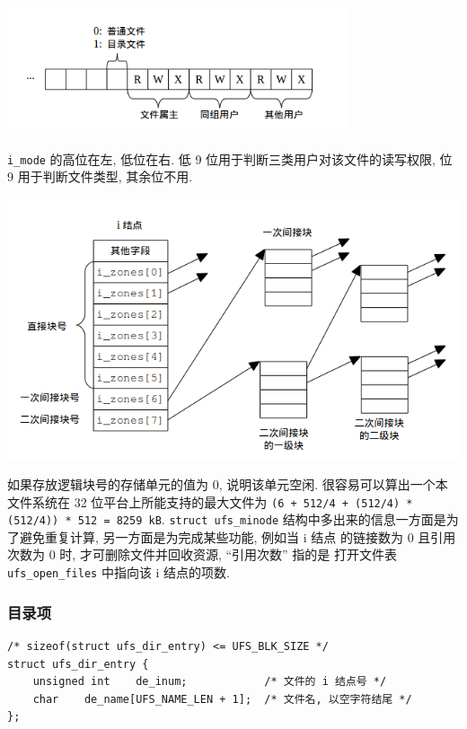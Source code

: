 \documentclass[nofonts]{ctexart}
\begin{document}
\begin{center}
\includegraphics[width=10cm]{./images/./imode.png}
\end{center}
\label{fig:i_mode}

\texttt{i\_mode} 的高位在左, 低位在右. 低 9
位用于判断三类用户对该文件的读写权限, 位 9 用于判断文件类型, 其余位不用.

\begin{center}
\includegraphics[width=15cm]{./images/./i_zones_array.png}
\end{center}
\label{fig:i_node}

如果存放逻辑块号的存储单元的值为 0, 说明该单元空闲.
很容易可以算出一个本文件系统在 32 位平台上所能支持的最大文件为
\texttt{(6 + 512/4 + (512/4) * (512/4)) * 512 = 8259 kB}.
\texttt{struct ufs\_minode} 结构中多出来的信息一方面是为了避免重复计算,
另一方面是为完成某些功能, 例如当 i 结点 的链接数为 0 且引用次数为 0 时,
才可删除文件并回收资源, ``引用次数'' 指的是 打开文件表
\texttt{ufs\_open\_files} 中指向该 i 结点的项数.

\subsubsection{目录项}\label{ux76eeux5f55ux9879}

\begin{verbatim}
/* sizeof(struct ufs_dir_entry) <= UFS_BLK_SIZE */
struct ufs_dir_entry {
    unsigned int    de_inum;            /* 文件的 i 结点号 */
    char    de_name[UFS_NAME_LEN + 1];  /* 文件名, 以空字符结尾 */
};
\end{verbatim}
\end{document}
